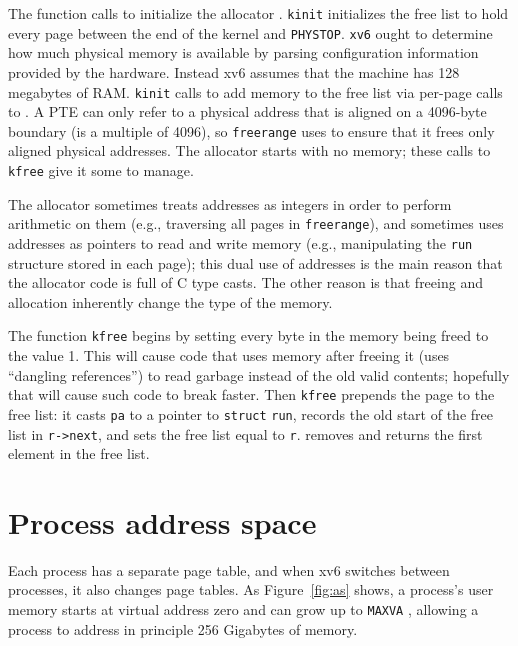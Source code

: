 The function
calls
to initialize the allocator
.
\lstinline{kinit}
initializes the free list to hold
every page between the end of the kernel and {\tt PHYSTOP}.
\lstinline{xv6}
ought to determine how much physical
memory is available by parsing configuration information 
provided by the hardware.
Instead xv6 assumes that the machine has
128 megabytes of RAM.
\lstinline{kinit}
calls
to add memory to the free list via per-page calls to
.
A PTE can only refer to a physical address that is aligned
on a 4096-byte boundary (is a multiple of 4096), so
\lstinline{freerange}
uses
to ensure that it frees only aligned physical addresses.
The allocator starts with no memory;
these calls to
\lstinline{kfree}
give it some to manage.

The allocator sometimes treats addresses as integers
in order to perform arithmetic on them (e.g.,
traversing all pages in
\lstinline{freerange}),
and sometimes uses addresses as pointers to read and
write memory (e.g., manipulating the
\lstinline{run}
structure stored in each page);
this dual use of addresses is the main reason that the
allocator code is full of C type casts.
The other reason is that freeing and allocation inherently
change the type of the memory.

The function
\lstinline{kfree}
begins by setting every byte in the
memory being freed to the value 1.
This will cause code that uses memory after freeing it
(uses ``dangling references'')
to read garbage instead of the old valid contents;
hopefully that will cause such code to break faster.
Then
\lstinline{kfree}
prepends the page to the free list:
it casts
\lstinline{pa}
to a pointer to
\lstinline{struct}
\lstinline{run},
records the old start of the free list in
\lstinline{r->next},
and sets the free list equal to
\lstinline{r}.
removes and returns the first element in the free list.

\section{Process address space}

Each process has a separate page table, and when xv6 switches between
processes, it also changes page tables.
As 
Figure~\ref{fig:as} shows,
a process's user memory starts at virtual address
zero and can grow up to
\texttt{MAXVA}
,
allowing a process to address in principle 256 Gigabytes of memory.

